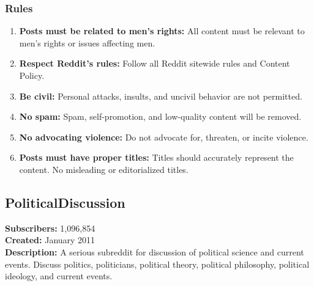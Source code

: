 \subsubsection{Rules}
\begin{enumerate}
    \item \textbf{Posts must be related to men's rights:} All content must be relevant to men's rights or issues affecting men.
    
    \item \textbf{Respect Reddit's rules:} Follow all Reddit sitewide rules and Content Policy.
    
    \item \textbf{Be civil:} Personal attacks, insults, and uncivil behavior are not permitted.
    
    \item \textbf{No spam:} Spam, self-promotion, and low-quality content will be removed.
    
    \item \textbf{No advocating violence:} Do not advocate for, threaten, or incite violence.
    
    \item \textbf{Posts must have proper titles:} Titles should accurately represent the content. No misleading or editorialized titles.
\end{enumerate}

\subsection{PoliticalDiscussion}
\textbf{Subscribers:} 1,096,854 \\
\textbf{Created:} January 2011 \\
\textbf{Description:} A serious subreddit for discussion of political science and current events. Discuss politics, politicians, political theory, political philosophy, political ideology, and current events.


